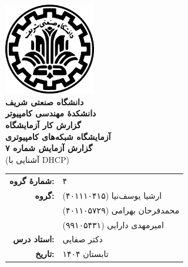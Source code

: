 \documentclass[12pt]{article}
\newcommand{\persianordinal}[1]{%
	\ifcase#1
	\or اول%
	\or دوم%
	\or سوم%
	\or چهارم%
	\or پنجم%
	\or ششم%
	\or هفتم%
	\or هشتم%
	\or نهم%
	\or دهم%
	\or یازدهم%
	\or دوازدهم%
	\or سیزدهم%
	\or چهاردهم%
	\or پانزدهم%
	\or شانزدهم%
	\or هفدهم%
	\or هجدهم%
	\or نوزدهم%
	\or بیستم%
	\else #1\fi
}
\newcommand{\persianordinalpage}{\persianfont\persianordinal{\value{page}}}
\begin{document}
	
	\begin{titlepage}
		\centering
		\vspace*{1cm}
		\includegraphics[width=4cm]{sharif.png}\\[1.5cm]
		{\Large\textbf{دانشگاه صنعتی شریف}}\\[0.5cm]
		{\large\textbf{دانشکدهٔ مهندسی کامپیوتر}}\\[1.5cm]
		{\Huge\textbf{گزارش کار آزمایشگاه}}\\[0.5cm]
		{\LARGE\textbf{آزمایشگاه شبکه‌های کامپیوتری}}\\[2cm]
		
		\textbf{گزارش آزمایش شماره ۷}\\
		(آشنایی با \textenglish{DHCP}‬‬)
		
		\vfill
		\begin{tabular}{rl}
			\textbf{شمارهٔ گروه:} & ۴ \\
			\textbf{گروه:} &
			ارشیا یوسف‌نیا (۴۰۱۱۱۰۴۱۵) \\
			& محمد‌فرحان بهرامی (۴۰۱۱۰۵۷۲۹) \\
			& امیرمهدی دارایی (۹۹۱۰۵۴۳۱) \\
			\textbf{استاد درس:} & دکتر صفایی \\
			\textbf{تاریخ:} & تابستان ۱۴۰۴ \\
		\end{tabular}
	\end{titlepage}
	
	\clearpage
	\setcounter{page}{1}
	\renewcommand{\thepage}{\persianordinalpage}
	
	\tableofcontents
	\clearpage
	\listoffigures
	
	\clearpage
	\setcounter{page}{1}
	\renewcommand{\thepage}{\persianfont\arabic{page}}
	
	
\end{document}
